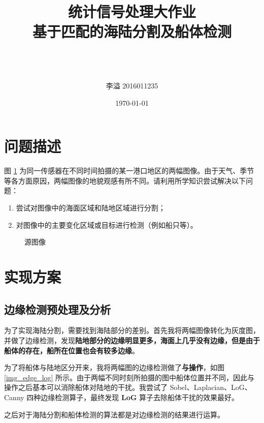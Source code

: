 \documentclass[UTF8,12pt]{ctexart}
\title{\textbf{\Huge{统计信号处理大作业} \\[2ex] \LARGE{基于匹配的海陆分割及船体检测}}}
\author{\\ \\ \\ 李\quad 溢 2016011235}
\date{\today}
\begin{document}

\pagestyle{main}
\begin{titlepage}
\maketitle
\end{titlepage}
\tableofcontents  %
\newpage


\section{问题描述}
图 \ref{img_src} 为同一传感器在不同时间拍摄的某一港口地区的两幅图像。由于天气、季节等各方面原因，两幅图像的地貌观感有所不同。请利用所学知识尝试解决以下问题：
\begin{enumerate}
\setlength{\itemsep}{5pt}
\setlength{\parsep}{0pt}
\setlength{\parskip}{0pt}

	\item 尝试对图像中的海面区域和陆地区域进行分割；
	\item 对图像中的主要变化区域或目标进行检测（例如船只等）。
\end{enumerate}

\begin{figure}[!htbp]
	\centering
	\caption{源图像}
	\label{img_src}
\end{figure}



\section{实现方案}
\subsection{边缘检测预处理及分析}
为了实现海陆分割，需要找到海陆部分的差别。首先我将两幅图像转化为灰度图，并做了边缘检测，发现\textbf{陆地部分的边缘明显更多，海面上几乎没有边缘，但是由于船体的存在，船所在位置也会有较多边缘}。

为了将船体与陆地区分开来，我将两幅图的边缘检测做了\textbf{与操作}，如图 \ref{img_edge_log} 所示。由于两幅不同时刻所拍摄的图中船体位置并不同，因此与操作之后基本可以消除船体对陆地的干扰。我尝试了 Sobel、Laplacian、LoG、Canny 四种边缘检测算子，最终发现 \textbf{LoG} 算子去除船体干扰的效果最好。

之后对于海陆分割和船体检测的算法都是对边缘检测的结果进行运算。
\end{document}
